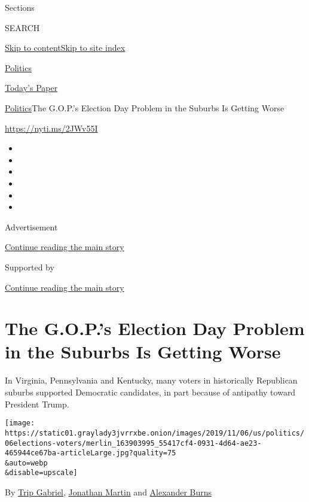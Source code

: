 Sections

SEARCH

\protect\hyperlink{site-content}{Skip to
content}\protect\hyperlink{site-index}{Skip to site index}

\href{https://www.nytimes3xbfgragh.onion/section/politics}{Politics}

\href{https://myaccount.nytimes3xbfgragh.onion/auth/login?response_type=cookie\&client_id=vi}{}

\href{https://www.nytimes3xbfgragh.onion/section/todayspaper}{Today's
Paper}

\href{/section/politics}{Politics}\textbar{}The G.O.P.'s Election Day
Problem in the Suburbs Is Getting Worse

\url{https://nyti.ms/2JWv55I}

\begin{itemize}
\item
\item
\item
\item
\item
\item
\end{itemize}

Advertisement

\protect\hyperlink{after-top}{Continue reading the main story}

Supported by

\protect\hyperlink{after-sponsor}{Continue reading the main story}

\hypertarget{the-gops-election-day-problem-in-the-suburbs-is-getting-worse}{%
\section{The G.O.P.'s Election Day Problem in the Suburbs Is Getting
Worse}\label{the-gops-election-day-problem-in-the-suburbs-is-getting-worse}}

In Virginia, Pennsylvania and Kentucky, many voters in historically
Republican suburbs supported Democratic candidates, in part because of
antipathy toward President Trump.

\texttt{[image: https://static01.graylady3jvrrxbe.onion/images/2019/11/06/us/politics/06elections-voters/merlin\_163903995\_55417cf4-0931-4d64-ae23-465944ce67ba-articleLarge.jpg?quality=75\\\&auto=webp\\\&disable=upscale]}

By \href{https://www.nytimes3xbfgragh.onion/by/trip-gabriel}{Trip
Gabriel},
\href{https://www.nytimes3xbfgragh.onion/by/jonathan-martin}{Jonathan
Martin} and
\href{https://www.nytimes3xbfgragh.onion/by/alexander-burns}{Alexander
Burns}


